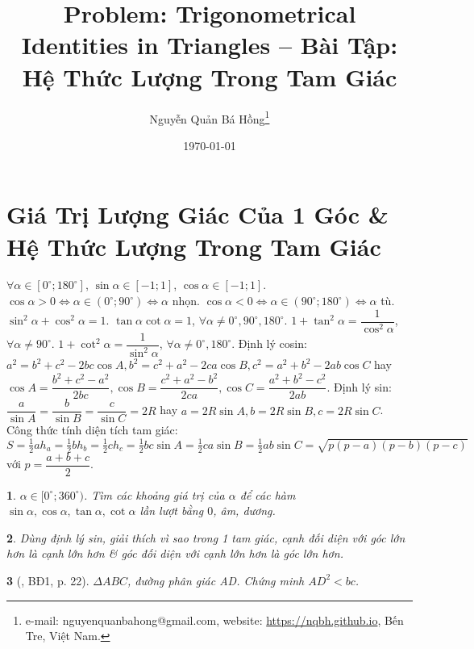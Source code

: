 \documentclass{article}
\title{Problem: Trigonometrical Identities in Triangles -- Bài Tập: Hệ Thức Lượng Trong Tam Giác}
\author{Nguyễn Quản Bá Hồng\footnote{e-mail: {\sf nguyenquanbahong@gmail.com}, website: \url{https://nqbh.github.io}, Bến Tre, Việt Nam.}}
\date{\today}
\newtheorem{baitoan}{}
\begin{document}
\maketitle
\tableofcontents


\section{Giá Trị Lượng Giác Của 1 Góc \& Hệ Thức Lượng Trong Tam Giác}
 $\forall\alpha\in[0^\circ;180^\circ]$, $\sin\alpha\in[-1;1]$, $\cos\alpha\in[-1;1]$.  $\cos\alpha > 0\Leftrightarrow\alpha\in(0^\circ;90^\circ)\Leftrightarrow\alpha$ nhọn. $\cos\alpha < 0\Leftrightarrow\alpha\in(90^\circ;180^\circ)\Leftrightarrow\alpha$ tù. $\sin^2\alpha + \cos^2\alpha = 1$. $\tan\alpha\cot\alpha = 1$, $\forall\alpha\ne0^\circ,90^\circ,180^\circ$. $1 + \tan^2\alpha = \dfrac{1}{\cos^2\alpha}$, $\forall\alpha\ne90^\circ$. $1 + \cot^2\alpha = \dfrac{1}{\sin^2\alpha}$, $\forall\alpha\ne0^\circ,180^\circ$.  {\sf Định lý cosin}: $a^2 = b^2 + c^2 - 2bc\cos A,b^2 = c^2 + a^2 - 2ca\cos B,c^2 = a^2 + b^2 - 2ab\cos C$ hay $\cos A = \dfrac{b^2 + c^2 - a^2}{2bc},\cos B = \dfrac{c^2 + a^2 - b^2}{2ca},\cos C = \dfrac{a^2 + b^2 - c^2}{2ab}$.  {\sf Định lý sin}: $\dfrac{a}{\sin A} = \dfrac{b}{\sin B} = \dfrac{c}{\sin C} = 2R$ hay $a = 2R\sin A,b = 2R\sin B,c = 2R\sin C$.  Công thức tính diện tích tam giác: $S = \frac{1}{2}ah_a = \frac{1}{2}bh_b = \frac{1}{2}ch_c = \frac{1}{2}bc\sin A = \frac{1}{2}ca\sin B = \frac{1}{2}ab\sin C = \sqrt{p(p - a)(p - b)(p - c)}$ với $p = \dfrac{a + b + c}{2}$.

\begin{baitoan}
	$\alpha\in[0^\circ;360^\circ)$. Tìm các khoảng giá trị của $\alpha$ để các hàm $\sin\alpha,\cos\alpha,\tan\alpha,\cot\alpha$ lần lượt bằng $0$, âm, dương.
\end{baitoan}

\begin{baitoan}
	Dùng định lý sin, giải thích vì sao trong 1 tam giác, cạnh đối diện với góc lớn hơn là cạnh lớn hơn \& góc đối diện với cạnh lớn hơn là góc lớn hơn.
\end{baitoan}

\begin{baitoan}[\cite{Hai_Hung_Thu_Tung2022_tap_1}, BĐ1, p. 22]
	$\Delta ABC$, đường phân giác AD. Chứng minh $AD^2 < bc$.
\end{baitoan}
\end{document}
